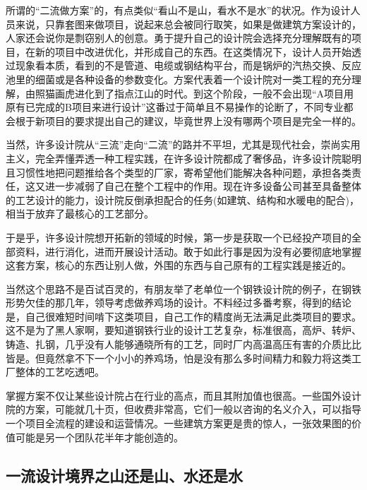 \documentclass[
]{book}
\begin{document}
所谓的``二流做方案''的，有点类似``看山不是山，看水不是水''的状况。作为设计人员来说，只靠套图来做项目，说起来总会被同行取笑，如果是做建筑方案设计的，人家还会说你是剽窃别人的创意。勇于提升自己的设计院会选择充分理解既有的项目，在新的项目中改进优化，并形成自己的东西。在这类情况下，设计人员开始透过现象看本质，看到的不是管道、电缆或钢结构平台，而是锅炉的汽热交换、反应池里的细菌或是各种设备的参数变化。方案代表着一个设计院对一类工程的充分理解，由照猫画虎进化到了指点江山的时代。到这个阶段，一般不会出现``A项目用原有已完成的B项目来进行设计''这番过于简单且不易操作的论断了，不同专业都会根于新项目的要求提出自己的建议，毕竟世界上没有哪两个项目是完全一样的。

当然，许多设计院从``三流''走向``二流''的路并不平坦，尤其是现代社会，崇尚实用主义，完全弄懂弄透一种工程实践，在许多设计院都成了奢侈品，许多设计院聪明且习惯性地把问题推给各个类型的厂家，寄希望他们能解决各种问题，承担各类责任，这又进一步减弱了自己在整个工程中的作用。现在许多设备公司甚至具备整体的工艺设计的能力，设计院反倒承担配合的任务(如建筑、结构和水暖电的配合)，相当于放弃了最核心的工艺部分。

于是乎，许多设计院想开拓新的领域的时候，第一步是获取一个已经投产项目的全部资料，进行消化，进而开展设计活动。敢于如此行事是因为没有必要彻底地掌握这套方案，核心的东西让别人做，外围的东西与自己原有的工程实践是接近的。

当然这个思路不是百试百灵的，有朋友举了老单位一个钢铁设计院的例子，在钢铁形势欠佳的那几年，领导考虑做养鸡场的设计。不料经过多番考察，得到的结论是，自己很难短时间啃下这类项目，自己工作的精度尚无法满足此类项目的要求。这不是为了黑人家啊，要知道钢铁行业的设计工艺复杂，标准很高，高炉、转炉、铸造、扎钢，几乎没有人能够通晓所有的工艺，同时厂内高温高压有害的介质比比皆是。但竟然拿不下一个小小的养鸡场，怕是没有那么多时间精力和毅力将这类工厂整体的工艺吃透吧。

掌握方案不仅让某些设计院占在行业的高点，而且其附加值也很高。一些国外设计院的方案，可能就几十页，但收费非常高，它们一般以咨询的名义介入，可以指导一个项目全流程的建设和运营情况。一些建筑方案更是贵的惊人，一张效果图的价值可能是另一个团队花半年才能创造的。

\hypertarget{ux4e00ux6d41ux8bbeux8ba1ux5883ux754cux4e4bux5c71ux8fd8ux662fux5c71ux6c34ux8fd8ux662fux6c34}{%
\subsection{一流设计境界之山还是山、水还是水}\label{ux4e00ux6d41ux8bbeux8ba1ux5883ux754cux4e4bux5c71ux8fd8ux662fux5c71ux6c34ux8fd8ux662fux6c34}}
\end{document}
